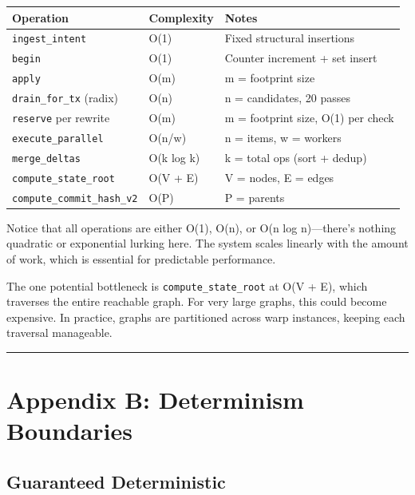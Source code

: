 \documentclass[11pt]{book}
\newcounter{none} %
\begin{document}
{\def\LTcaptype{none} %
\begin{longtable}[]{@{}lll@{}}
\toprule\noalign{}
Operation & Complexity & Notes \\
\midrule\noalign{}
\endhead
\bottomrule\noalign{}
\endlastfoot
\texttt{ingest\_intent} & O(1) & Fixed structural insertions \\
\texttt{begin} & O(1) & Counter increment + set insert \\
\texttt{apply} & O(m) & m = footprint size \\
\texttt{drain\_for\_tx} (radix) & O(n) & n = candidates, 20 passes \\
\texttt{reserve} per rewrite & O(m) & m = footprint size, O(1) per
check \\
\texttt{execute\_parallel} & O(n/w) & n = items, w = workers \\
\texttt{merge\_deltas} & O(k log k) & k = total ops (sort + dedup) \\
\texttt{compute\_state\_root} & O(V + E) & V = nodes, E = edges \\
\texttt{compute\_commit\_hash\_v2} & O(P) & P = parents \\
\end{longtable}
}

\begin{tourguide}
Notice that all operations are either O(1), O(n), or O(n log n)---there's nothing quadratic or exponential lurking here. The system scales linearly with the amount of work, which is essential for predictable performance.

The one potential bottleneck is \texttt{compute\_state\_root} at O(V + E), which traverses the entire reachable graph. For very large graphs, this could become expensive. In practice, graphs are partitioned across warp instances, keeping each traversal manageable.
\end{tourguide}

\begin{center}\rule{0.5\linewidth}{0.5pt}\end{center}

\section{Appendix B: Determinism
Boundaries}\label{appendix-b-determinism-boundaries}

\subsection{Guaranteed Deterministic}\label{guaranteed-deterministic}
\end{document}

